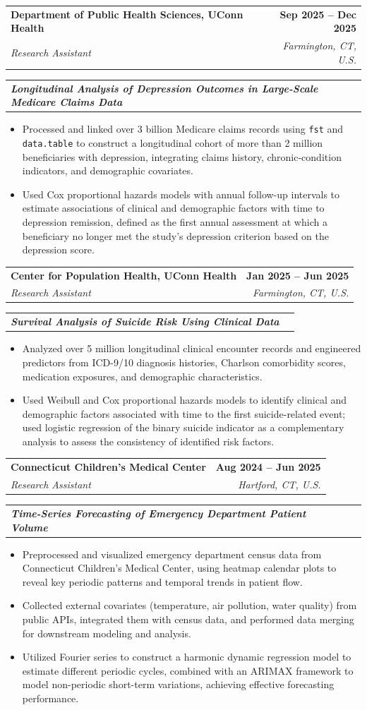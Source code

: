 \documentclass[letterpaper,11pt]{article}
\makeatletter
\newcommand{\resumeItem}[1]{
  \item\small{
    {#1 \vspace{-2pt}}
  }
}
\newcommand{\resumeSubheading}[4]{
  \vspace{-2pt}\item
    \begin{tabular*}{1.0\textwidth}[t]{l@{\extracolsep{\fill}}r}
      \textbf{#1} & \textbf{\small #2} \\
      \textit{\small#3} & \textit{\small #4} \\
    \end{tabular*}\vspace{-8pt}
}
\newcommand{\resumeSubSubheading}[2]{
    \item
    \begin{tabular*}{0.97\textwidth}{l@{\extracolsep{\fill}}r}
      \textit{\textbf{\small#1}} & \textit{\small #2} \\
    \end{tabular*}\vspace{-5pt}
}
\newcommand{\resumeItemListStart}{\begin{itemize}}
\newcommand{\resumeItemListEnd}{\end{itemize}\vspace{-5pt}}
\makeatother
\begin{document}
    \resumeSubheading
    {Department of Public Health Sciences, UConn Health}{Sep 2025 -- Dec 2025}{Research Assistant}{Farmington, CT, U.S.}
    \resumeSubSubheading{Longitudinal Analysis of Depression Outcomes in Large-Scale Medicare Claims Data}{}
    \resumeItemListStart
      \resumeItem{Processed and linked over 3 billion Medicare claims records using \texttt{fst} and \texttt{data.table} to construct a longitudinal cohort of more than 2 million beneficiaries with depression, integrating claims history, chronic-condition indicators, and demographic covariates.}
      \resumeItem{Used Cox proportional hazards models with annual follow-up intervals to estimate associations of clinical and demographic factors with time to depression remission, defined as the first annual assessment at which a beneficiary no longer met the study's depression criterion based on the depression score.}
\resumeItemListEnd


    \resumeSubheading
    {Center for Population Health, UConn Health}{Jan 2025 -- Jun 2025}{Research Assistant}{Farmington, CT, U.S.}
    \resumeSubSubheading{Survival Analysis of Suicide Risk Using Clinical Data}{}
    \resumeItemListStart
    \resumeItem{Analyzed over 5 million longitudinal clinical encounter records and engineered predictors from ICD-9/10 diagnosis histories, Charlson comorbidity scores, medication exposures, and demographic characteristics.}
    \resumeItem{Used Weibull and Cox proportional hazards models to identify clinical and demographic factors associated with time to the first suicide-related event; used logistic regression of the binary suicide indicator as a complementary analysis to assess the consistency of identified risk factors.}
    \resumeItemListEnd
      
    \resumeSubheading
      {Connecticut Children's Medical Center}{Aug 2024 -- Jun 2025}
      {Research Assistant}{Hartford, CT, U.S.}
    \resumeSubSubheading{Time-Series Forecasting of Emergency Department Patient Volume}{}
      \resumeItemListStart
        \resumeItem{Preprocessed and visualized emergency department census data from Connecticut Children's Medical Center, using heatmap calendar plots to reveal key periodic patterns and temporal trends in patient flow.}
        \resumeItem{Collected external covariates (temperature, air pollution, water quality) from public APIs, integrated them with census data, and performed data merging for downstream modeling and analysis.}
        \resumeItem{Utilized Fourier series to construct a harmonic dynamic regression model to estimate different periodic cycles, combined with an ARIMAX framework to model non-periodic short-term variations, achieving effective forecasting performance.}
        \resumeItemListEnd
\end{document}
